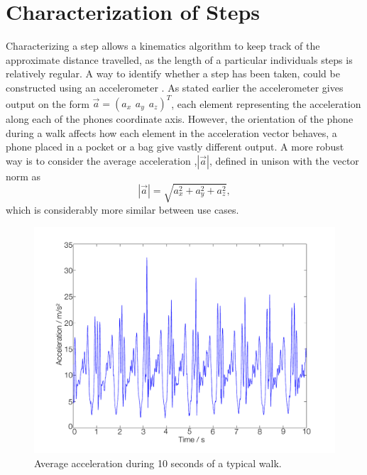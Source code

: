 \documentclass{LTHthesis}
\begin{document}
\section{Characterization of Steps}
\label{sec:step}
%
Characterizing a step allows a kinematics algorithm to keep track of the approximate distance travelled, as the length of a particular individuals steps is relatively regular. A way to identify whether a step has been taken, could be constructed using an accelerometer \cite{step_count}. As stated earlier the accelerometer gives output on the form $\vec a = (a_x \hspace{5pt} a_y \hspace{5pt} a_z)^T$, each element representing the acceleration along each of the phones  coordinate axis. However, the orientation of the phone during a walk affects how each element in the acceleration vector behaves, a phone placed in a pocket or a bag give vastly different output. A more robust way is to consider the average acceleration ,$|\vec a|$, defined in unison with the vector norm as 
%
\begin{equation}
|\vec a| = \sqrt{a_x^2+a_y^2+a_z^2},
\end{equation}
%
which is considerably more similar between use cases.
%
\begin{figure}[!hbt]

\includegraphics[width=1\textwidth ]{images/kinematic/avr_acc}
\caption{Average acceleration during 10 seconds of a typical walk.}\label{avr_acc}
\end{figure}
\end{document}
